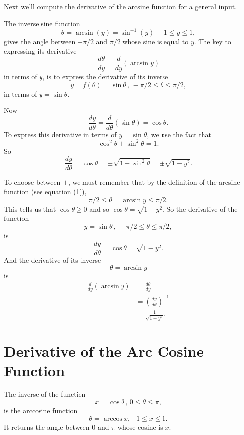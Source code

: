 \documentclass{ximera}
\begin{document}
Next we'll compute the derivative of the arcsine function for a general input.




\begin{example} \label{Ecbfghnbng}
The inverse sine function
\[
    \theta = \arcsin(y) = \sin^{-1}(y) \, -1\leq y \leq 1 ,
\]
gives the angle between $-\pi/2$ and $\pi/2$ whose sine is equal to $y$. The key to expressing its derivative
\[
  \frac{d\theta}{dy} = \frac{d}{dy}\left(  \arcsin y \right)
\]
in terms of $y$, is to express the derivative of its inverse
\[
 y=f(\theta) = \sin\theta \, , \, -\pi/2 \leq \theta \leq \pi/2, 
\]
in terms of $y=\sin\theta$.

Now
\[
     \frac{dy}{d\theta} = \frac{d}{d\theta} \left( \sin\theta \right) = \cos\theta .
\]
To express this derivative in terms of $y=\sin\theta$, we use the fact that 
\[
 \cos^2\theta + \sin^2\theta = 1 .
\]
So 
\[
      \frac{dy}{d\theta} = \cos\theta = \pm \sqrt{1-\sin^2\theta} = \pm \sqrt{1-y^2}.
\]

To choose between $\pm$, we must remember that by the definition of the arcsine function (see equation (1)), 
\[
   \pi/2 \leq \theta = \arcsin y \leq \pi/2 .
\]
This tells us that $\cos\theta \geq 0$ and so $\cos\theta = \sqrt{1-y^2}$. So the derivative of the function 
\[
     y = \sin\theta \, , \, -\pi/2 \leq \theta \leq \pi/2, 
\]
is
\[
       \frac{dy}{d\theta} = \cos\theta = \sqrt{1-y^2} .
\]
And the derivative of its inverse
\[
   \theta = \arcsin y
\]
is
\begin{align*}
 \frac{d}{dy}\left(  \arcsin y \right)   &= \frac{d\theta}{dy}\\
                                                      &= \left( \frac{dy}{d\theta} \right)^{-1}\\                      
                                                       &= \frac{1}{\sqrt{1-y^2}}.
\end{align*}
\end{example}

\section{Derivative of the Arc Cosine Function}
The inverse of the function
\[
   x = \cos \theta \, , \, 0\leq \theta \leq \pi ,
\]
is the arccosine function
\[
 \theta = \arccos x , -1\leq x \leq 1 .
\]
It returns the angle between $0$ and $\pi$ whose cosine is $x$.
\end{document}
